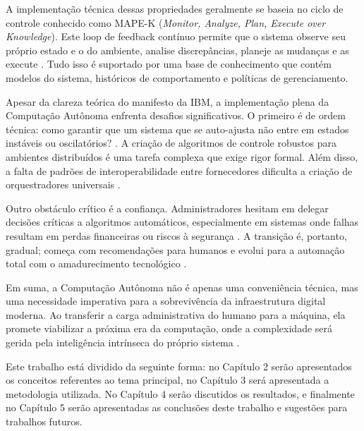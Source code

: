 A implementação técnica dessas propriedades geralmente se baseia no ciclo de controle conhecido como MAPE-K (\textit{Monitor, Analyze, Plan, Execute over Knowledge}). Este loop de feedback contínuo permite que o sistema observe seu próprio estado e o do ambiente, analise discrepâncias, planeje as mudanças e as execute \cite{lalanda2013}. Tudo isso é suportado por uma base de conhecimento que contém modelos do sistema, históricos de comportamento e políticas de gerenciamento.

Apesar da clareza teórica do manifesto da IBM, a implementação plena da Computação Autônoma enfrenta desafios significativos. O primeiro é de ordem técnica: como garantir que um sistema que se auto-ajusta não entre em estados instáveis ou oscilatórios? \cite{correa2007}. A criação de algoritmos de controle robustos para ambientes distribuídos é uma tarefa complexa que exige rigor formal. Além disso, a falta de padrões de interoperabilidade entre fornecedores dificulta a criação de orquestradores universais \cite{kephart2003}.

Outro obstáculo crítico é a confiança. Administradores hesitam em delegar decisões críticas a algoritmos automáticos, especialmente em sistemas onde falhas resultam em perdas financeiras ou riscos à segurança \cite{kephart2003}. A transição é, portanto, gradual; começa com recomendações para humanos e evolui para a automação total com o amadurecimento tecnológico \cite{correa2007}.

Em suma, a Computação Autônoma não é apenas uma conveniência técnica, mas uma necessidade imperativa para a sobrevivência da infraestrutura digital moderna. Ao transferir a carga administrativa do humano para a máquina, ela promete viabilizar a próxima era da computação, onde a complexidade será gerida pela inteligência intrínseca do próprio sistema \cite{ibm2001, sterritt2005}.

Este trabalho está dividido da seguinte forma: no Capítulo 2 serão
apresentados os conceitos referentes ao tema principal, no Capítulo 3
será apresentada a metodologia utilizada. No Capítulo 4 serão
discutidos os resultados, e finalmente no Capítulo 5 serão
apresentadas as conclusões deste trabalho e sugestões para trabalhos
futuros.
